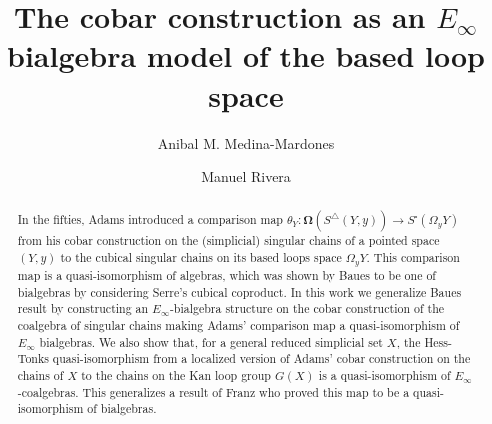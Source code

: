 \documentclass{amsart}
\newcommand{\cobar}{\mathbf{\Omega}}
\theoremstyle{definition}
\begin{document}
\title{The cobar construction as an $E_\infty$ bialgebra model of the based loop space}
\author{Anibal M. Medina-Mardones}
\address{Max Plank Institute for Mathematics, Bonn, Germany}
\address{Department of Mathematics, University of Notre Dame, Notre Dame, IN, USA}
\author{Manuel Rivera}
\address{Purdue University}


\begin{abstract}
    In the fifties, Adams introduced a comparison map $\theta_Y \colon \cobar(S^\triangle(Y,y)) \to S^\square(\Omega_y Y)$ from his cobar construction on the (simplicial) singular chains of a pointed space $(Y, y)$ to the cubical singular chains on its based loops space $\Omega_y Y$.
	This comparison map is a quasi-isomorphism of algebras, which was shown by Baues to be one of bialgebras by considering Serre's cubical coproduct.
	In this work we generalize Baues result by constructing an $E_{\infty}$-bialgebra structure on the cobar construction of the coalgebra of singular chains making Adams' comparison map a quasi-isomorphism of $E_\infty$ bialgebras.
	We also show that, for a general reduced simplicial set $X$, the Hess-Tonks quasi-isomorphism from a localized version of Adams' cobar construction on the chains of $X$ to the chains on the Kan loop group $G(X)$ is a quasi-isomorphism of $E_\infty$-coalgebras.
	This generalizes a result of Franz who proved this map to be a quasi-isomorphism of bialgebras.
\end{abstract}



\vspace*{-1cm}

\maketitle
\tableofcontents








\end{document}
